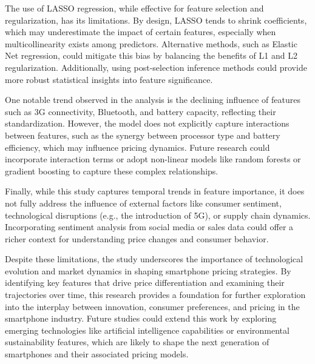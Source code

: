 \documentclass[12pt]{article}
\begin{document}
The use of LASSO regression, while effective for feature selection and regularization, has its limitations. By design, LASSO tends to shrink coefficients, which may underestimate the impact of certain features, especially when multicollinearity exists among predictors. Alternative methods, such as Elastic Net regression, could mitigate this bias by balancing the benefits of L1 and L2 regularization. Additionally, using post-selection inference methods could provide more robust statistical insights into feature significance.

One notable trend observed in the analysis is the declining influence of features such as 3G connectivity, Bluetooth, and battery capacity, reflecting their standardization. However, the model does not explicitly capture interactions between features, such as the synergy between processor type and battery efficiency, which may influence pricing dynamics. Future research could incorporate interaction terms or adopt non-linear models like random forests or gradient boosting to capture these complex relationships.

Finally, while this study captures temporal trends in feature importance, it does not fully address the influence of external factors like consumer sentiment, technological disruptions (e.g., the introduction of 5G), or supply chain dynamics. Incorporating sentiment analysis from social media or sales data could offer a richer context for understanding price changes and consumer behavior.

Despite these limitations, the study underscores the importance of technological evolution and market dynamics in shaping smartphone pricing strategies. By identifying key features that drive price differentiation and examining their trajectories over time, this research provides a foundation for further exploration into the interplay between innovation, consumer preferences, and pricing in the smartphone industry. Future studies could extend this work by exploring emerging technologies like artificial intelligence capabilities or environmental sustainability features, which are likely to shape the next generation of smartphones and their associated pricing models.
\end{document}

